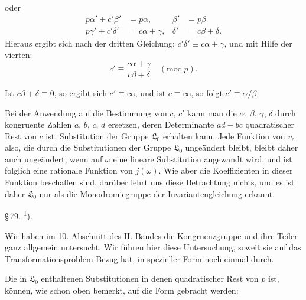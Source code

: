 oder
\[
\begin{aligned}
p\alpha' + c'\beta' &= p\alpha, & \beta' &= p\beta\\
p\gamma' + c'\delta' &= c\alpha+\gamma, & \delta' &= c\beta+\delta.
\end{aligned}
\]
Hieraus ergibt sich nach der dritten Gleichung: $c'\delta' \equiv
c\alpha+\gamma$, und mit Hilfe der vierten:
\[
c' \equiv \frac{c\alpha+\gamma}{c\beta+\delta} \quad (\mathrm{mod}\ p).
\]

Ist $c\beta+\delta \equiv 0$, so ergibt sich $c' \equiv \infty$, und ist
$c \equiv \infty$, so folgt $c' \equiv \alpha/\beta$.

Bei der Anwendung auf die Bestimmung von $c$, $c'$ kann man
die $\alpha$, $\beta$, $\gamma$, $\delta$ durch kongruente Zahlen $a$, $b$, $c$, $d$
ersetzen, deren Determinante $ad-bc$ quadratischer Rest von $c$
ist, %
Substitution der Gruppe $\mathfrak{L}_0$ erhalten kann. Jede Funktion von
$v_c$ also, die durch die Substitutionen der Gruppe $\mathfrak{L}_0$ ungeändert
bleibt, bleibt daher auch ungeändert, wenn auf $\omega$ eine lineare
Substitution angewandt wird, und ist folglich eine rationale
Funktion von $j(\omega)$. Wie aber die Koeffizienten in dieser Funktion
beschaffen sind, darüber lehrt uns diese Betrachtung nichts, und
es ist daher $\mathfrak{L}_0$ nur als die Monodromiegruppe der Invariantengleichung
erkannt.

\begin{center}
\S\,79. \textsuperscript{1}).
\end{center}

Wir haben im 10. Abschnitt des II. Bandes die Kongruenzgruppe
 und ihre Teiler ganz allgemein untersucht. Wir führen
hier diese Untersuchung, soweit sie auf das Transformationsproblem
 Bezug hat, in spezieller Form noch einmal durch.

Die in $\mathfrak{L}_0$ enthaltenen Substitutionen
in denen
quadratischer Rest von $p$ ist, können, wie schon oben bemerkt,
auf die Form gebracht werden:

\begingroup
\renewcommand{\thefootnote}{1)}
\endgroup
